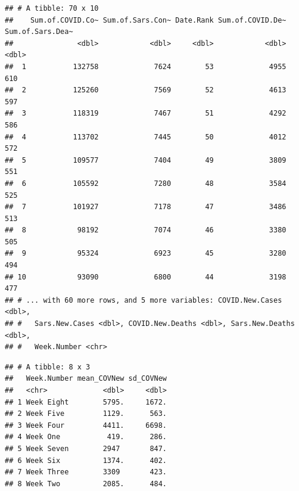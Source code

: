 \documentclass[
]{article}
\newenvironment{Shaded}{\begin{snugshade}}{\end{snugshade}}
\newcommand{\DataTypeTok}[1]{\textcolor[rgb]{0.13,0.29,0.53}{#1}}
\newcommand{\DecValTok}[1]{\textcolor[rgb]{0.00,0.00,0.81}{#1}}
\newcommand{\KeywordTok}[1]{\textcolor[rgb]{0.13,0.29,0.53}{\textbf{#1}}}
\newcommand{\NormalTok}[1]{#1}
\newcommand{\OperatorTok}[1]{\textcolor[rgb]{0.81,0.36,0.00}{\textbf{#1}}}
\newcommand{\StringTok}[1]{\textcolor[rgb]{0.31,0.60,0.02}{#1}}
\begin{document}
\begin{verbatim}
## # A tibble: 70 x 10
##    Sum.of.COVID.Co~ Sum.of.Sars.Con~ Date.Rank Sum.of.COVID.De~ Sum.of.Sars.Dea~
##               <dbl>            <dbl>     <dbl>            <dbl>            <dbl>
##  1           132758             7624        53             4955              610
##  2           125260             7569        52             4613              597
##  3           118319             7467        51             4292              586
##  4           113702             7445        50             4012              572
##  5           109577             7404        49             3809              551
##  6           105592             7280        48             3584              525
##  7           101927             7178        47             3486              513
##  8            98192             7074        46             3380              505
##  9            95324             6923        45             3280              494
## 10            93090             6800        44             3198              477
## # ... with 60 more rows, and 5 more variables: COVID.New.Cases <dbl>,
## #   Sars.New.Cases <dbl>, COVID.New.Deaths <dbl>, Sars.New.Deaths <dbl>,
## #   Week.Number <chr>
\end{verbatim}

\begin{Shaded}
\end{Shaded}

\begin{verbatim}
## # A tibble: 8 x 3
##   Week.Number mean_COVNew sd_COVNew
##   <chr>             <dbl>     <dbl>
## 1 Week Eight        5795.     1672.
## 2 Week Five         1129.      563.
## 3 Week Four         4411.     6698.
## 4 Week One           419.      286.
## 5 Week Seven        2947       847.
## 6 Week Six          1374.      402.
## 7 Week Three        3309       423.
## 8 Week Two          2085.      484.
\end{verbatim}
\end{document}
